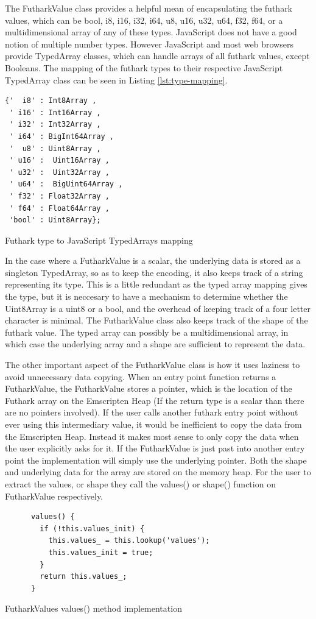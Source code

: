 \documentclass[11pt]{book}
\begin{document}
The FutharkValue class provides a helpful mean of encapsulating the futhark values, which can be
bool, i8, i16, i32, i64, u8, u16, u32, u64, f32, f64, or a multidimensional array of any of these types. JavaScript does not have a good notion of multiple number types. However JavaScript and most web browsers provide TypedArray classes, which can handle arrays of all futhark values, except Booleans. The mapping of the futhark types to their respective JavaScript TypedArray class can be seen in Listing \ref{lst:type-mapping}.

\begin{listing}[H]
\begin{verbatim}
{'  i8' : Int8Array ,
 ' i16' : Int16Array ,
 ' i32' : Int32Array ,
 ' i64' : BigInt64Array ,
 '  u8' : Uint8Array ,
 ' u16' :  Uint16Array ,
 ' u32' :  Uint32Array ,
 ' u64' :  BigUint64Array ,
 ' f32' : Float32Array ,
 ' f64' : Float64Array ,
 'bool' : Uint8Array};
\end{verbatim}
\caption{Futhark type to JavaScript TypedArrays mapping}
\label{lst:type-mapping}
\end{listing}

In the case where a FutharkValue is a scalar, the underlying data is stored as a singleton TypedArray, so as to keep the encoding, it also keeps track of a string representing its type. This is a little redundant as the typed array mapping gives the type, but it is neccesary to have a mechanism to determine whether the Uint8Array is a uint8 or a bool, and the overhead of keeping track of a four letter character is minimal. The FutharkValue class also keeps track of the shape of the futhark value. The typed array can possibly be a multidimensional array, in which case the underlying array and a shape are sufficient to represent the data.

The other important aspect of the FutharkValue class is how it uses laziness to avoid unnecessary data copying. When an entry point function returns a FutharkValue, the FutharkValue stores a pointer, which is the location of the Futhark array on the Emscripten Heap (If the return type is a scalar than there are no pointers involved). If the user calls another futhark entry point without ever using this intermediary value, it would be inefficient to copy the data from the Emscripten Heap. Instead it makes most sense to only copy the data when the user explicitly asks for it. If the FutharkValue is just past into another entry point the implementation will simply use the underlying pointer. Both the shape and underlying data for the array are stored on the memory heap. For the user to extract the values, or shape they call the values() or shape() function on FutharkValue respectively.
\begin{listing}[H]
\begin{verbatim}
      values() {
        if (!this.values_init) {
          this.values_ = this.lookup('values');
          this.values_init = true;
        }
        return this.values_;
      }
\end{verbatim}
\caption{FutharkValues values() method implementation}
\label{lst:values-implementation}
\end{listing}
\end{document}
